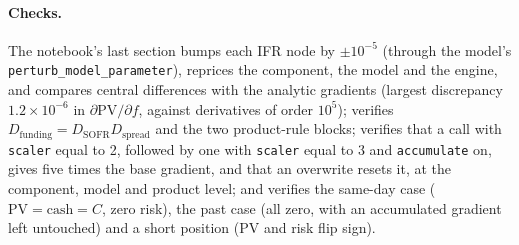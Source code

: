 \documentclass[11pt]{article}
\begin{document}
\paragraph{Checks.}
The notebook's last section bumps each IFR node by $\pm10^{-5}$ (through the model's \texttt{perturb\_model\_parameter}), reprices the component, the model and the engine, and compares central differences with the analytic gradients (largest discrepancy $1.2\times10^{-6}$ in $\partial\mathrm{PV}/\partial f$, against derivatives of order $10^{5}$); verifies $D_{\mathrm{funding}}=D_{\mathrm{SOFR}}D_{\mathrm{spread}}$ and the two product-rule blocks; verifies that a call with \texttt{scaler} equal to 2, followed by one with \texttt{scaler} equal to 3 and \texttt{accumulate} on, gives five times the base gradient, and that an overwrite resets it, at the component, model and product level; and verifies the same-day case ($\mathrm{PV}=\text{cash}=C$, zero risk), the past case (all zero, with an accumulated gradient left untouched) and a short position (PV and risk flip sign).
\end{document}
